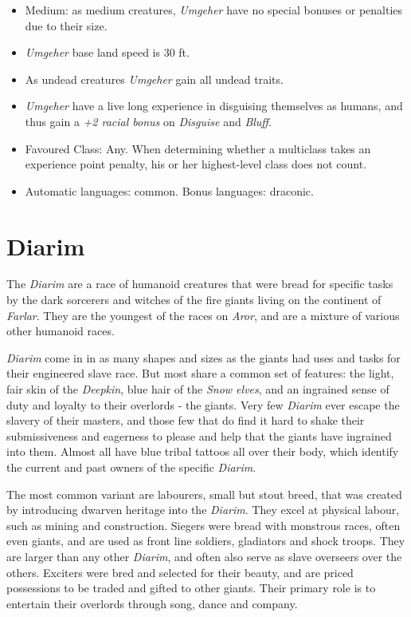 \begin{35e}
  \begin{itemize}[noitemsep]
    \item Medium: as medium creatures, \emph{Umgeher} have no special bonuses or
    penalties due to their size.
    \item \emph{Umgeher} base land speed is 30 ft.
    \item As undead creatures \emph{Umgeher} gain all undead traits.
    \item \emph{Umgeher} have a live long experience in disguising themselves as
    humans, and thus gain a \emph{+2 racial bonus} on \emph{Disguise} and
    \emph{Bluff}.
    \item Favoured Class: Any. When determining whether a multiclass takes an
    experience point penalty, his or her highest-level class does not count.
    \item Automatic languages: common. Bonus languages: draconic.
  \end{itemize}
\end{35e}

\section*{Diarim}


The \emph{Diarim} are a race of humanoid creatures that were bread for
specific tasks by the dark sorcerers and witches of the fire giants living on
the continent of \emph{Farlar}. They are the youngest of the races
on \emph{Aror}, and are a mixture of various other humanoid races.

\emph{Diarim} come in in as many shapes and sizes as the giants had uses and
tasks for their engineered slave race. But most share a common set of features:
the light, fair skin of the \emph{Deepkin}, blue hair of the \emph{Snow elves},
and an ingrained sense of duty and loyalty to their overlords - the giants. Very
few \emph{Diarim} ever escape the slavery of their masters, and those few that
do find it hard to shake their submissiveness and eagerness to please and help
that the giants have ingrained into them. Almost all have blue tribal tattoos
all over their body, which identify the current and past owners of the specific
\emph{Diarim}.

The most common variant are labourers, small but stout breed, that was created
by introducing dwarven heritage into the \emph{Diarim}. They excel at physical
labour, such as mining and construction. Siegers were bread with monstrous
races, often even giants, and are used as front line soldiers, gladiators and
shock troops. They are larger than any other \emph{Diarim}, and often also
serve as slave overseers over the others. Exciters were bred and selected for
their beauty, and are priced possessions to be traded and gifted to other
giants. Their primary role is to entertain their overlords through song, dance
and company.

